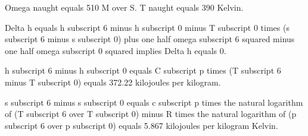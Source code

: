 Omega naught equals 510 M over S. T naught equals 390 Kelvin.

Delta h equals h subscript 6 minus h subscript 0 minus T subscript 0 times (s subscript 6 minus s subscript 0) plus one half omega subscript 6 squared minus one half omega subscript 0 squared implies Delta h equals 0.

h subscript 6 minus h subscript 0 equals C subscript p times (T subscript 6 minus T subscript 0) equals 372.22 kilojoules per kilogram.

s subscript 6 minus s subscript 0 equals c subscript p times the natural logarithm of (T subscript 6 over T subscript 0) minus R times the natural logarithm of (p subscript 6 over p subscript 0) equals 5.867 kilojoules per kilogram Kelvin.